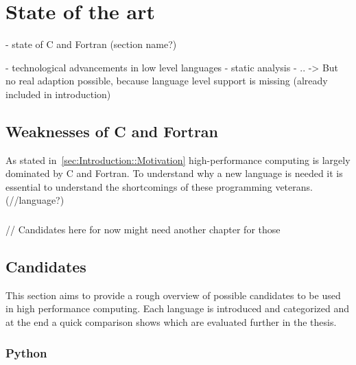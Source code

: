 \chapter{State of the art}
\label{chap:State_of_the_art}


- state of C and Fortran (section name?)

- technological advancements in low level languages
    - static analysis
    - ..
    -> But no real adaption possible, because language level support is missing (already included in introduction)

\section{Weaknesses of C and Fortran} %
\label{sec:State_of_the_art::Weaknesses_C_Fortran}

As stated in~\autoref{sec:Introduction::Motivation} high-performance computing is largely dominated by C and Fortran. To understand why a new language is needed it is essential to understand the shortcomings of these programming veterans. (//language?)

\subsection*{}

// Candidates here for now might need another chapter for those
\section{Candidates}
\label{sec:State_of_the_art::Candidates}

This section aims to provide a rough overview of possible candidates to be used in high performance computing. Each language is introduced and categorized and at the end a quick comparison shows which are evaluated further in the thesis.

\subsection*{Python}
\label{subsec:State_of_the_art::Candidates::Python}

